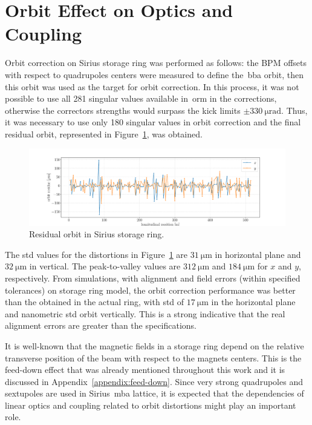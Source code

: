 \section{Orbit Effect on Optics and Coupling}\label{sec:orbit_effect}
Orbit correction on Sirius storage ring was performed as follows: the BPM offsets with respect to quadrupoles centers were measured to define the~\gls{bba} orbit, then this orbit was used as the target for orbit correction. In this process, it was not possible to use all 281 singular values available in~\gls{orm} in the corrections, otherwise the correctors strengths would surpass the kick limits $\pm \SI{330}{\micro\radian}$. Thus, it was necessary to use only 180 singular values in orbit correction and the final residual orbit, represented in Figure~\ref{fig:orbit_residue}, was obtained.
\begin{figure}
\centering
\includegraphics[width=1.0\textwidth]{figures/orbit_residue.pdf}
\caption{Residual orbit in Sirius storage ring.}
\label{fig:orbit_residue}
\end{figure}

The std values for the distortions in Figure~\ref{fig:orbit_residue} are $\SI{31}{\micro\meter}$ in horizontal plane and $\SI{32}{\micro\meter}$ in vertical. The peak-to-valley values are $\SI{312}{\micro\meter}$ and $\SI{184}{\micro\meter}$ for $x$ and $y$, respectively. From simulations, with alignment and field errors (within specified tolerances) on storage ring model, the orbit correction performance was better than the obtained in the actual ring, with std of $\SI{17}{\micro\meter}$ in the horizontal plane and nanometric std orbit vertically. This is a strong indicative that the real alignment errors are greater than the specifications.

It is well-known that the magnetic fields in a storage ring depend on the relative transverse position of the beam with respect to the magnets centers. This is the feed-down effect that was already mentioned throughout this work and it is discussed in Appendix~\ref{appendix:feed-down}. Since very strong quadrupoles and sextupoles are used in Sirius~\gls{mba} lattice, it is expected that the dependencies of linear optics and coupling related to orbit distortions might play an important role.

